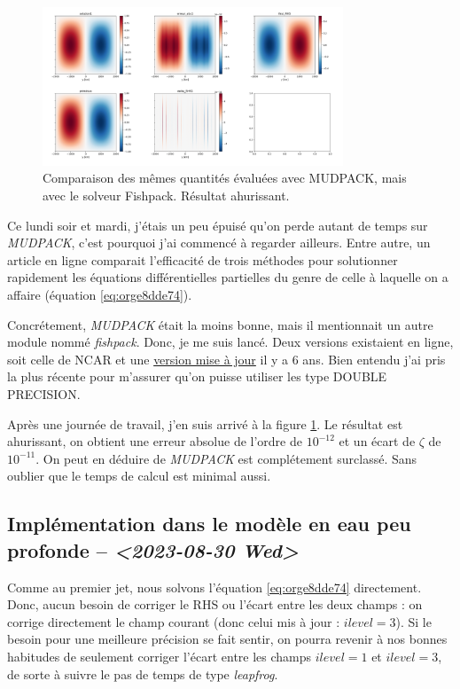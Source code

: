 \documentclass[10pt]{article}
\numberwithin{equation}{section}
\begin{document}
\begin{figure}[!htpb]
\centering
\includegraphics[width=0.8\textwidth]{figures/fishpack/2023-08-29-fishtest.png}
\caption{\label{fig:orga89437a}Comparaison des mêmes quantités évaluées avec MUDPACK, mais avec le solveur Fishpack. Résultat ahurissant.}
\end{figure}

Ce lundi soir et mardi, j'étais un peu épuisé qu'on perde autant de temps sur \emph{MUDPACK}, c'est pourquoi j'ai commencé à regarder ailleurs.
Entre autre, un article en ligne comparait l'efficacité de trois méthodes pour solutionner rapidement les équations différentielles partielles du genre de celle à laquelle on a affaire (équation \ref{eq:orge8dde74}).\bigskip

Concrétement, \emph{MUDPACK} était la moins bonne, mais il mentionnait un autre module nommé \emph{fishpack}.
Donc, je me suis lancé.
Deux versions existaient en ligne, soit celle de NCAR et une \href{https://github.com/jlokimlin/fishpack}{version mise à jour} il y a 6 ans.
Bien entendu j'ai pris la plus récente pour m'assurer qu'on puisse utiliser les type DOUBLE PRECISION.\bigskip

Après une journée de travail, j'en suis arrivé à la figure \ref{fig:orga89437a}.
Le résultat est ahurissant, on obtient une erreur absolue de l'ordre de \(10^{-12}\) et un écart de \(\zeta\) de \(10^{-11}\).
On peut en déduire de \emph{MUDPACK} est complétement surclassé.
Sans oublier que le temps de calcul est minimal aussi.
\subsection{Implémentation dans le modèle en eau peu profonde -- \textit{<2023-08-30 Wed>}}
\label{sec:orgcd86b13}

Comme au premier jet, nous solvons l'équation \ref{eq:orge8dde74} directement.
Donc, aucun besoin de corriger le RHS ou l'écart entre les deux champs : on corrige directement le champ courant (donc celui mis à jour : \(ilevel=3\)).
Si le besoin pour une meilleure précision se fait sentir, on pourra revenir à nos bonnes habitudes de seulement corriger l'écart entre les champs \(ilevel=1\) et \(ilevel=3\), de sorte à suivre le pas de temps de type \emph{leapfrog}.
\end{document}
